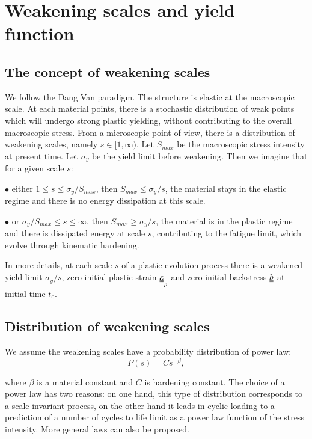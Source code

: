\documentclass[3p,times,number,review]{elsarticle}
\begin{document}
\clearpage

\section{Weakening scales and yield function}
\subsection{The concept of weakening scales} 

We follow the Dang Van paradigm. The structure is elastic at the macroscopic scale. At each material points, there is a stochastic distribution of weak points which will undergo strong plastic yielding, without contributing to the overall macroscopic stress. From a microscopic point of view, there is a distribution of weakening scales, namely $s\in[1,\infty)$. Let $S_{max}$ be the macroscopic stress intensity at present time. Let $\sigma_y$ be the yield limit before weakening. Then we imagine that for a given scale $s$:

\vspace{6pt}
\noindent
$\bullet$ either $1\leqslant s\leqslant \sigma_y/S_{max}$, then $S_{max}\leqslant \sigma_y/s$, the material stays in the elastic regime and there is no energy dissipation at this scale.

\vspace{6pt}
\noindent
$\bullet$ or $\sigma_y/S_{max}\leqslant s\leqslant \infty$, then $S_{max}\geqslant \sigma_y/s$, the material is in the plastic regime and there is dissipated energy at scale $s$, contributing to the fatigue limit, which evolve through kinematic hardening.

In more details, at each scale $s$ of a plastic evolution process there is a weakened yield limit $\sigma_y/s$, zero initial plastic strain $\uuline{\varepsilon}_p$ and zero initial backstress $\uuline{b}$ at initial time $t_0$.


\vspace{6pt}

\subsection{Distribution of weakening scales}

We assume the weakening scales have a  probability distribution of power law: 
$$P(s) = Cs^{-\beta},$$

where $\beta$ is a material constant and $C$ is hardening constant. 
The choice of a power law has two reasons: on one hand, this type of distribution corresponds to a scale invariant process, on the other hand it leads in cyclic loading to a prediction of a number of cycles to life limit as a power law function of the stress intensity. More general laws can also be proposed.
\end{document}
